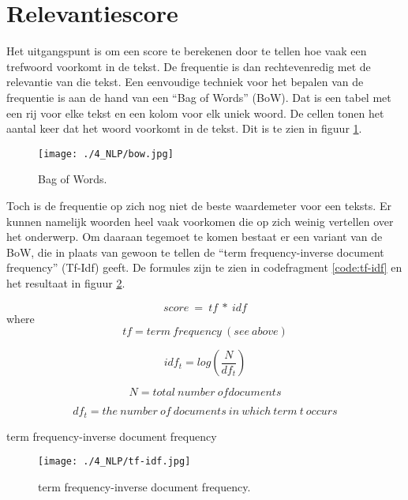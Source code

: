 \section{Relevantiescore}
Het uitgangspunt is om een score te berekenen door te tellen hoe vaak een trefwoord voorkomt in de tekst. De frequentie is dan rechtevenredig met de relevantie van die tekst. Een eenvoudige techniek voor het bepalen van de frequentie is aan de hand van een ``Bag of Words'' (BoW). Dat is een tabel met een rij voor elke tekst en een kolom voor elk uniek woord. De cellen tonen het aantal keer dat het woord voorkomt in de tekst.  Dit is te zien in figuur \ref{fig:bow}.
\begin{figure}
    \centering
    \texttt{[image: ./4\_NLP/bow.jpg]}
    \caption[Bag of Words.]{\label{fig:bow}Bag of Words.}
\end{figure}
Toch is de frequentie op zich nog niet de beste waardemeter voor een teksts. Er kunnen namelijk woorden heel vaak voorkomen die op zich weinig vertellen over het onderwerp. Om daaraan tegemoet te komen bestaat er een variant van de BoW, die in plaats van gewoon te tellen de ``term frequency-inverse document frequency'' (Tf-Idf) geeft. De formules zijn te zien in codefragment \ref{code:tf-idf} en het resultaat in figuur \ref{fig:tf-idf}.
\begin{listing}
    \begin{equation}
        score\ =\ tf\ \ast\ idf
    \end{equation}  
    where
    \begin{equation}
        tf=term\ frequency\ \left(see\ above\right)
    \end{equation} 
    
    \begin{equation}
        idf_t=log\left(\frac{N}{df_t}\right)
    \end{equation}  
    
    \begin{equation} 
        N=total\ number\ ofdocuments
    \end{equation}  
    
    \begin{equation} 
        df_t=the\ number\ of\ documents\ in\ which\ term\ t\ occurs
    \end{equation}  
    \caption[term frequency-inverse document frequency]{term frequency-inverse document frequency}
    \label{code:tf-idf}
\end{listing}
\begin{figure}
    \centering
    \texttt{[image: ./4\_NLP/tf-idf.jpg]}
    \caption[term frequency-inverse document frequency.]{\label{fig:tf-idf}term frequency-inverse document frequency.}
\end{figure}
